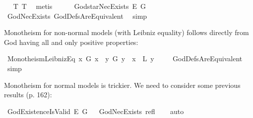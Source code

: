\begin{isabellebody}
\isadelimproof
\ %
\endisadelimproof
%
\isatagproof
{}\isamarkupfalse%
\ T{}\ T{}\ \isamarkupfalse%
\ metis%
\endisatagproof
{\isafoldproof}%
%
\isadelimproof
%
\endisadelimproof
\ \ \ \ \isanewline
{}\isamarkupfalse%
\ God{\isacharunderscore}starNecExists{\isacharcolon}\ {\isachardoublequoteopen}{\isasymlfloor}\isactrlbold {\isasymbox}\isactrlbold {\isasymexists}\isactrlsup E\ G{\isacharasterisk}{\isasymrfloor}{\isachardoublequoteclose}\ \isanewline
%
\isadelimproof
\ \ %
\endisadelimproof
%
\isatagproof
{}\isamarkupfalse%
\ GodNecExists\ GodDefsAreEquivalent\ \isamarkupfalse%
\ simp%
\endisatagproof
{\isafoldproof}%
%
\isadelimproof
%
\endisadelimproof
%
\isamarkuptrue%
%
\begin{isamarkuptext}%
Monotheism for non-normal models (with Leibniz equality) follows directly from God having all and only positive properties:%
\end{isamarkuptext}\isamarkuptrue%
\isamarkupfalse%
\ Monotheism{\isacharunderscore}LeibnizEq{\isacharcolon}\ {\isachardoublequoteopen}{\isasymlfloor}\isactrlbold {\isasymforall}x{\isachardot}\ G\ x\ \isactrlbold {\isasymrightarrow}\ {\isacharparenleft}\isactrlbold {\isasymforall}y{\isachardot}\ G\ y\ \isactrlbold {\isasymrightarrow}\ {\isacharparenleft}x\ \ \isactrlbold {\isasymapprox}\isactrlsup L\ y{\isacharparenright}{\isacharparenright}{\isasymrfloor}{\isachardoublequoteclose}\ \isanewline
%
\isadelimproof
\ \ %
\endisadelimproof
%
\isatagproof
{}\isamarkupfalse%
\ GodDefsAreEquivalent\ \isamarkupfalse%
\ simp%
\endisatagproof
{\isafoldproof}%
%
\isadelimproof
%
\endisadelimproof
%
\begin{isamarkuptext}%
Monotheism for normal models is trickier. We need to consider some previous results (p. 162):%
\end{isamarkuptext}\isamarkuptrue%
\isamarkupfalse%
\ GodExistenceIsValid{\isacharcolon}\ {\isachardoublequoteopen}{\isasymlfloor}\isactrlbold {\isasymexists}\isactrlsup E\ G{\isasymrfloor}{\isachardoublequoteclose}%
\isadelimproof
\ %
\endisadelimproof
%
\isatagproof
{}\isamarkupfalse%
\ GodNecExists\ refl\isanewline
\ \ \isamarkupfalse%
\ auto\ %
%
\endisatagproof
{\isafoldproof}%
%
\isadelimproof
%
\endisadelimproof
%
\begin{isamarkuptext}%

\end{isamarkuptext}
\end{isabellebody}
